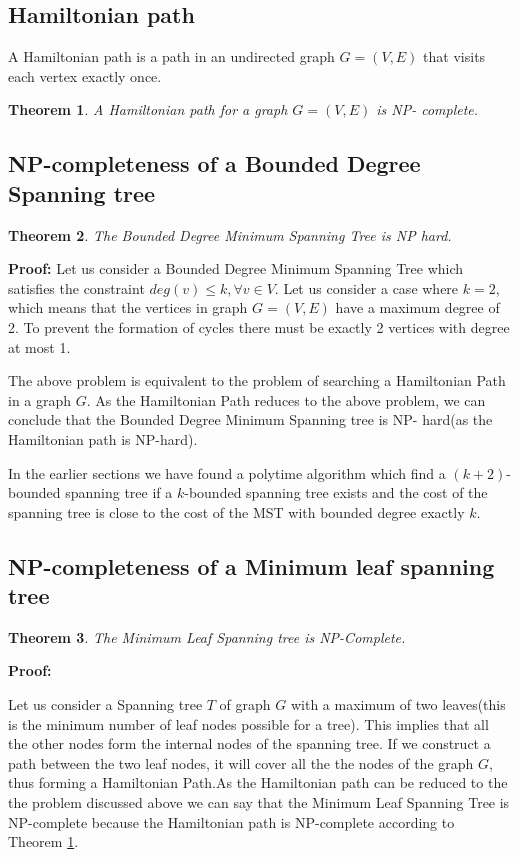 \documentclass[12pt]{article}
\newtheorem{theorem}{Theorem}
\theoremstyle{plain}
\begin{document}
\subsection*{Hamiltonian path }

A Hamiltonian path is a path in an undirected graph $G=(V, E)$ that visits each vertex exactly once.\\

\begin{theorem} \label{Ham}
A Hamiltonian path for a graph $G=(V, E)$ is NP- complete.
\end{theorem}

\subsection*{NP-completeness of a Bounded Degree Spanning tree}
\begin{theorem}
The Bounded Degree Minimum Spanning Tree is NP hard.

\end{theorem}
\noindent
\textbf{Proof:}
Let us consider a Bounded Degree Minimum Spanning Tree which satisfies the constraint $deg(v) \leq k,  \forall v \in V$. Let us consider a case where $k=2$, which means that the vertices in  graph $G=(V,E)$ have a maximum degree of 2. To prevent the formation of cycles there must be exactly 2 vertices with degree at most 1.

The above problem is equivalent to the problem of searching a Hamiltonian Path in a graph $G$. As the Hamiltonian Path reduces to the above problem, we can conclude that the  Bounded Degree Minimum Spanning tree 
is NP- hard(as the Hamiltonian path is NP-hard).

 In the earlier sections we have found a polytime algorithm which find a $(k+2)$-bounded spanning tree if a 
$k$-bounded spanning tree exists and the cost of the spanning tree is close to the cost of the MST with 
bounded degree exactly $k$.

\subsection*{NP-completeness of a Minimum leaf spanning tree}

\begin{theorem}
The Minimum Leaf Spanning tree is NP-Complete.
\end{theorem}

\noindent
\textbf{Proof:}

Let us consider a Spanning tree $T$ of graph $G$ with a maximum of two leaves(this is the minimum number of leaf nodes possible for a tree). This implies that all the other nodes form the internal nodes of the spanning tree. If we construct a path between the two leaf nodes, it will cover all the the nodes of the graph $G$, thus forming a Hamiltonian Path.As the Hamiltonian path can be reduced to the the problem discussed above we can say that the Minimum Leaf Spanning Tree is NP-complete because the Hamiltonian path is NP-complete according to Theorem \ref{Ham}.
\end{document}
